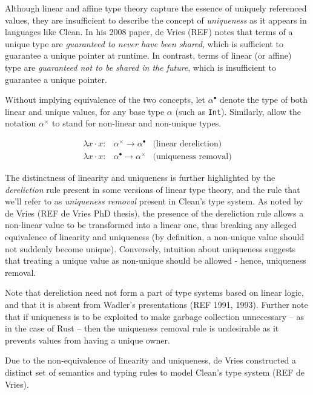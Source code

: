 \documentclass[]{unswthesis}
\begin{document}
Although linear and affine type theory capture the essence of uniquely referenced values, they are insufficient to describe the concept of \textit{uniqueness} as it appears in languages like Clean. In his 2008 paper, de Vries (REF) notes that terms of a unique type are \textit{guaranteed to never have been shared}, which is sufficient to guarantee a unique pointer at runtime. In contrast, terms of linear (or affine) type are \textit{guaranteed not to be shared in the future}, which is insufficient to guarantee a unique pointer.

Without implying equivalence of the two concepts, let $\alpha^\bullet$ denote the type of both linear and unique values, for any base type $\alpha$ (such as \texttt{Int}). Similarly, allow the notation $\alpha^\times$ to stand for non-linear and non-unique types.

\begin{eqnarray*}
\lambda x \cdot x : & \alpha^\times \rightarrow \alpha^\bullet & \text{(linear dereliction)}\\
\lambda x \cdot x : & \alpha^\bullet \rightarrow \alpha^\times & \text{(uniqueness removal)}
\end{eqnarray*}

The distinctness of linearity and uniqueness is further highlighted by the \textit{dereliction} rule present in some versions of linear type theory, and the rule that we'll refer to as \textit{uniqueness removal} present in Clean's type system. As noted by de Vries (REF de Vries PhD thesis), the presence of the dereliction rule allows a non-linear value to be transformed into a linear one, thus breaking any alleged equivalence of linearity and uniqueness (by definition, a non-unique value should not suddenly become unique). Conversely, intuition about uniqueness suggests that treating a unique value as non-unique should be allowed - hence, uniqueness removal.

Note that dereliction need not form a part of type systems based on linear logic, and that it is absent from Wadler's presentations (REF 1991, 1993). Further note that if uniqueness is to be exploited to make garbage collection unnecessary -- as in the case of Rust -- then the uniqueness removal rule is undesirable as it prevents values from having a unique owner.

Due to the non-equivalence of linearity and uniqueness, de Vries constructed a distinct set of semantics and typing rules to model Clean's type system (REF de Vries).
\end{document}
